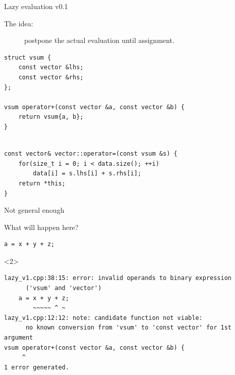 \documentclass[@BEAMER_OPTIONS@]{beamer}
\begin{document}
\note{ }

\begin{frame}[fragile]{Lazy evaluation v0.1}
    \begin{description}
        \item[The idea:] postpone the actual evaluation until assignment.
    \end{description}
    \pause
    \begin{exampleblock}{}
        \begin{lstlisting}
struct vsum {
    const vector &lhs;
    const vector &rhs;
};

vsum operator+(const vector &a, const vector &b) {
    return vsum{a, b};
}
        \end{lstlisting}
        \pause
        \begin{lstlisting}[firstnumber=last]

const vector& vector::operator=(const vsum &s) {
    for(size_t i = 0; i < data.size(); ++i)
        data[i] = s.lhs[i] + s.rhs[i];
    return *this;
}
        \end{lstlisting}
    \end{exampleblock}
\end{frame}

\note{ }

\begin{frame}[fragile]{Not general enough}
    \begin{exampleblock}{What will happen here?}
        \begin{lstlisting}
a = x + y + z;
        \end{lstlisting}
    \end{exampleblock}

    \begin{exampleblock}<2>{}
        \begin{verbatim}
lazy_v1.cpp:38:15: error: invalid operands to binary expression
      ('vsum' and 'vector')
    a = x + y + z;
        ~~~~~ ^ ~
lazy_v1.cpp:12:12: note: candidate function not viable:
      no known conversion from 'vsum' to 'const vector' for 1st argument
vsum operator+(const vector &a, const vector &b) {
     ^
1 error generated.
        \end{verbatim}
    \end{exampleblock}
\end{frame}

\note{ }
\end{document}
